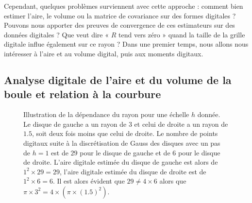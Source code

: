 Cependant, quelques problèmes surviennent avec cette approche : comment bien
estimer l'aire, le volume ou la matrice de covariance sur des formes digitales ?
Pouvons nous apporter des preuves de convergence de ces estimateurs sur des
données digitales ? Que veut dire « $R$ tend vers zéro » quand la taille de la
grille digitale influe également sur ce rayon ? Dans une premier temps, nous allons
nous intéresser à l'aire et au volume digital, puis aux moments
digitaux.

\subsection{Analyse digitale de l'aire et du volume de la boule et relation à la courbure}
\label{sec:ii-2d}

\begin{figure}[ht]
  \begin{center}
    
  \end{center}
  \caption
  {Illustration de la dépendance du rayon pour une échelle $h$ donnée. Le disque de gauche
  a un rayon de $3$ et celui de droite a un rayon de $1.5$, soit deux fois moins
  que celui de droite. Le nombre de points digitaux suite à la discrétisation de
  Gauss des disques avec un pas de $h=1$ est de $29$ pour le disque de gauche et
  de $6$ pour le disque de droite. L'aire digitale estimée du disque de gauche
  est alors de $1^2 \times 29 = 29$, l'aire digitale estimée du disque de droite
  est de $1^2 \times 6 = 6$. Il est alors évident que $29 \ne 4 \times
  6$ alors que $\pi \times 3^2 = 4 \times (\pi \times (1.5)^2)$.\label{fig:2d-area-2}}
\end{figure}

